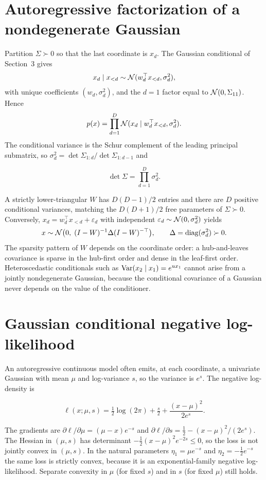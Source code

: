\section{Autoregressive factorization of a nondegenerate Gaussian}

Partition $\Sigma\succ 0$ so that the last coordinate is $x_d$. The Gaussian conditional of Section~3 gives
\[
x_d\mid x_{<d}\sim\mathcal{N}(w_d^\top x_{<d},\sigma_d^2),
\]
with unique coefficients $(w_d,\sigma_d^2)$, and the $d=1$ factor equal to $\mathcal{N}(0,\Sigma_{11})$. Hence
\[
p(x)=\prod_{d=1}^D \mathcal{N}(x_d\mid w_d^\top x_{<d},\sigma_d^2).
\]
The conditional variance is the Schur complement of the leading principal submatrix, so $\sigma_d^2=\det\Sigma_{1:d}/\det\Sigma_{1:d-1}$ and
\begin{resultbox}
\[
\det\Sigma=\prod_{d=1}^D\sigma_d^2.
\]
\end{resultbox}
A strictly lower-triangular $W$ has $D(D-1)/2$ entries and there are $D$ positive conditional variances, matching the $D(D+1)/2$ free parameters of $\Sigma\succ 0$. Conversely, $x_d=w_d^\top x_{<d}+\varepsilon_d$ with independent $\varepsilon_d\sim\mathcal{N}(0,\sigma_d^2)$ yields
\[
x\sim\mathcal{N}\bigl(0,\;(I-W)^{-1}\Delta(I-W)^{-\top}\bigr),\qquad\Delta=\operatorname{diag}(\sigma_d^2)\succ 0.
\]
The sparsity pattern of $W$ depends on the coordinate order: a hub-and-leaves covariance is sparse in the hub-first order and dense in the leaf-first order. Heteroscedastic conditionals such as $\mathrm{Var}(x_2\mid x_1)=e^{ux_1}$ cannot arise from a jointly nondegenerate Gaussian, because the conditional covariance of a Gaussian never depends on the value of the conditioner.

\section{Gaussian conditional negative log-likelihood}

An autoregressive continuous model often emits, at each coordinate, a univariate Gaussian with mean $\mu$ and log-variance $s$, so the variance is $e^s$. The negative log-density is
\begin{resultbox}
\begin{equation}
\label{eq:gauss-nll}
\ell(x;\mu,s)=\tfrac12\log(2\pi)+\tfrac s2+\frac{(x-\mu)^2}{2e^s}.
\end{equation}
\end{resultbox}
The gradients are $\partial\ell/\partial\mu=(\mu-x)e^{-s}$ and $\partial\ell/\partial s=\tfrac12-(x-\mu)^2/(2e^s)$. The Hessian in $(\mu,s)$ has determinant $-\tfrac12(x-\mu)^2 e^{-2s}\le 0$, so the loss is not jointly convex in $(\mu,s)$. In the natural parameters $\eta_1=\mu e^{-s}$ and $\eta_2=-\tfrac12 e^{-s}$ the same loss is strictly convex, because it is an exponential-family negative log-likelihood. Separate convexity in $\mu$ (for fixed $s$) and in $s$ (for fixed $\mu$) still holds.


